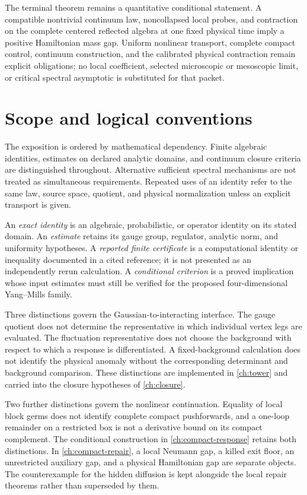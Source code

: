 \documentclass[11pt,oneside,openany]{book}
\theoremstyle{definition}
\theoremstyle{remark}
\begin{document}
The terminal theorem remains a quantitative conditional statement.
A compatible nontrivial continuum law, noncollapsed local probes,
and contraction on the complete centered reflected algebra at one
fixed physical time imply a positive Hamiltonian mass gap. Uniform
nonlinear transport, complete compact control, continuum construction,
and the calibrated physical contraction remain explicit obligations;
no local coefficient, selected microscopic or mesoscopic limit, or
critical spectral asymptotic is substituted for that packet.

\chapter*{Scope and logical conventions}
The exposition is ordered by mathematical dependency. Finite algebraic
identities, estimates on declared analytic domains, and continuum closure
criteria are distinguished throughout. Alternative sufficient spectral
mechanisms are not treated as simultaneous requirements. Repeated uses of
an identity refer to the same law, source space, quotient, and physical
normalization unless an explicit transport is given.

An \emph{exact identity} is an algebraic, probabilistic, or operator
identity on its stated domain. An \emph{estimate} retains its gauge group,
regulator, analytic norm, and uniformity hypotheses. A \emph{reported
finite certificate} is a computational identity or inequality documented
in a cited reference; it is not presented as an independently rerun
calculation. A \emph{conditional criterion} is a proved implication whose
input estimates must still be verified for the proposed four-dimensional
Yang--Mills family.

Three distinctions govern the Gaussian-to-interacting interface. The
gauge quotient does not determine the representative in which individual
vertex legs are evaluated. The fluctuation representative does not choose
the background with respect to which a response is differentiated. A
fixed-background calculation does not identify the physical anomaly
without the corresponding determinant and background comparison. These
distinctions are implemented in \cref{ch:tower} and carried into the
closure hypotheses of \cref{ch:closure}.

Two further distinctions govern the nonlinear continuation. Equality of
local block germs does not identify complete compact pushforwards, and
a one-loop remainder on a restricted box is not a derivative bound on
its compact complement. The conditional construction in
\cref{ch:compact-response} retains both distinctions. In
\cref{ch:compact-repair}, a local Neumann gap, a killed exit floor, an
unrestricted auxiliary gap, and a physical Hamiltonian gap are separate
objects. The counterexample for the hidden diffusion is kept alongside
the local repair theorems rather than superseded by them.
\end{document}
